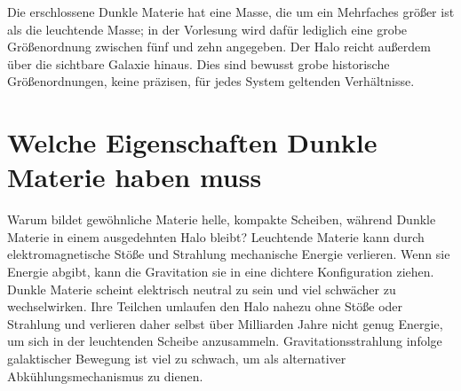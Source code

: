 Die erschlossene Dunkle Materie hat eine Masse, die um ein Mehrfaches größer ist als die leuchtende Masse; in der Vorlesung wird dafür lediglich eine grobe Größenordnung zwischen fünf und zehn angegeben. Der Halo reicht außerdem über die sichtbare Galaxie hinaus. Dies sind bewusst grobe historische Größenordnungen, keine präzisen, für jedes System geltenden Verhältnisse.

\section{Welche Eigenschaften Dunkle Materie haben muss}

Warum bildet gewöhnliche Materie helle, kompakte Scheiben, während Dunkle Materie in einem ausgedehnten Halo bleibt? Leuchtende Materie kann durch elektromagnetische Stöße und Strahlung mechanische Energie verlieren. Wenn sie Energie abgibt, kann die Gravitation sie in eine dichtere Konfiguration ziehen. Dunkle Materie scheint elektrisch neutral zu sein und viel schwächer zu wechselwirken. Ihre Teilchen umlaufen den Halo nahezu ohne Stöße oder Strahlung und verlieren daher selbst über Milliarden Jahre nicht genug Energie, um sich in der leuchtenden Scheibe anzusammeln. Gravitationsstrahlung infolge galaktischer Bewegung ist viel zu schwach, um als alternativer Abkühlungsmechanismus zu dienen.

\begin{classroomqa}
\end{classroomqa}

\begin{classroomqa}
\end{classroomqa}

